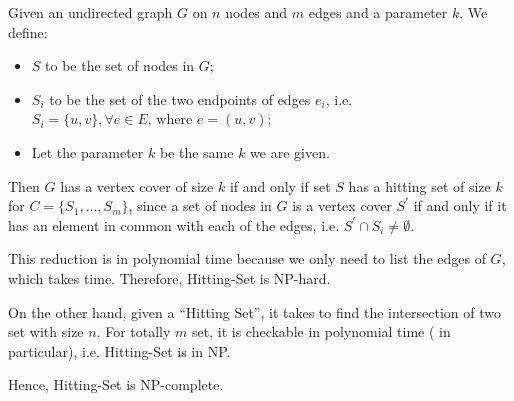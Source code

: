 \documentclass[12pt,letterpaper,titlepage,en-US]{article}
\begin{document}
\begin{homeworkProblem}[NP-completeness]
\begin{homeworkSubProblem}
Given an undirected graph $G$ on $n$ nodes and $m$ edges and a parameter $k$.
We define:
\begin{itemize}
    \item $S$ to be the set of nodes in $G$;
    \item $S_i$ to be the set of the
        two endpoints of edges $e_i$, i.e. $S_i = \{u,v\}, \forall e \in E \text{, where } e = (u,v)$;
    \item Let the parameter $k$ be the same $k$ we are given.
\end{itemize}
Then $G$ has a vertex cover of size $k$ if and only if set $S$ has a hitting set
of size $k$ for $C = \{S_1, \ldots , S_m\}$, since a set of nodes in $G$ is a vertex cover $S^\prime$
if and only if it has an element in common with each of the edges,
i.e. $S^\prime \cap S_i \neq \emptyset$.

This reduction is in polynomial time because we only need to list the edges
of $G$, which takes  time.
Therefore, Hitting-Set is NP-hard.

On the other hand, given a ``Hitting Set'', it takes  to find
the intersection of two set with size $n$. For totally $m$ set, it is checkable in polynomial
time ( in particular), i.e. Hitting-Set is in NP.

Hence, Hitting-Set is NP-complete.\hfill\qedsymbol
\end{homeworkSubProblem}

\end{homeworkProblem}
\end{document}

